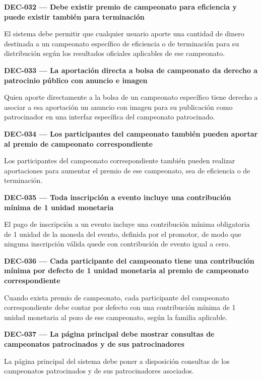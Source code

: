 \documentclass[10pt,letterpaper]{article}
\begin{document}
\noindent\textbf{DEC-032 --- Debe existir premio de campeonato para eficiencia y puede existir también para terminación}\par
El sistema debe permitir que cualquier usuario aporte una cantidad de dinero destinada a un campeonato específico de eficiencia o de terminación para su distribución según los resultados oficiales aplicables de ese campeonato.\par\vspace{0.45em}
\noindent\textbf{DEC-033 --- La aportación directa a bolsa de campeonato da derecho a patrocinio público con anuncio e imagen}\par
Quien aporte directamente a la bolsa de un campeonato específico tiene derecho a asociar a esa aportación un anuncio con imagen para su publicación como patrocinador en una interfaz específica del campeonato patrocinado.\par\vspace{0.45em}
\noindent\textbf{DEC-034 --- Los participantes del campeonato también pueden aportar al premio de campeonato correspondiente}\par
Los participantes del campeonato correspondiente también pueden realizar aportaciones para aumentar el premio de ese campeonato, sea de eficiencia o de terminación.\par\vspace{0.45em}
\noindent\textbf{DEC-035 --- Toda inscripción a evento incluye una contribución mínima de 1 unidad monetaria}\par
El pago de inscripción a un evento incluye una contribución mínima obligatoria de 1 unidad de la moneda del evento, definida por el promotor, de modo que ninguna inscripción válida quede con contribución de evento igual a cero.\par\vspace{0.45em}
\noindent\textbf{DEC-036 --- Cada participante del campeonato tiene una contribución mínima por defecto de 1 unidad monetaria al premio de campeonato correspondiente}\par
Cuando exista premio de campeonato, cada participante del campeonato correspondiente debe contar por defecto con una contribución mínima de 1 unidad monetaria al pozo de ese campeonato, según la familia aplicable.\par\vspace{0.45em}
\noindent\textbf{DEC-037 --- La página principal debe mostrar consultas de campeonatos patrocinados y de sus patrocinadores}\par
La página principal del sistema debe poner a disposición consultas de los campeonatos patrocinados y de sus patrocinadores asociados.\par\vspace{0.45em}
\end{document}
